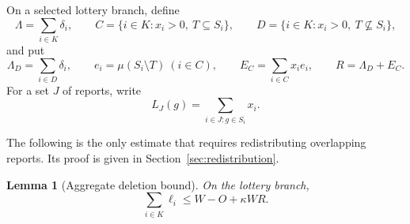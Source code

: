 \documentclass[11pt]{article}
\newtheorem{lemma}[theorem]{Lemma}
\begin{document}
On a selected lottery branch, define
\[
\Lambda=\sum_{i\in K}\delta_i,
\qquad
C=\{i\in K:x_i>0,\ T\subseteq S_i\},
\qquad
D=\{i\in K:x_i>0,\ T\not\subseteq S_i\},
\]
and put
\[
\Lambda_D=\sum_{i\in D}\delta_i,
\qquad
e_i=\mu(S_i\setminus T)\ (i\in C),
\qquad
E_C=\sum_{i\in C}x_ie_i,
\qquad
R=\Lambda_D+E_C.
\]
For a set $J$ of reports, write
\[
L_J(g)=\sum_{i\in J:g\in S_i}x_i.
\]

The following is the only estimate that requires redistributing
overlapping reports.
Its proof is given in Section~\ref{sec:redistribution}.

\begin{lemma}[Aggregate deletion bound]
\label{lem:aggregate}
On the lottery branch,
\begin{equation}
\label{eq:aggregate}
\sum_{i\in K}\ell_i
\le W-O+\kappa WR.
\end{equation}
\end{lemma}
\end{document}
